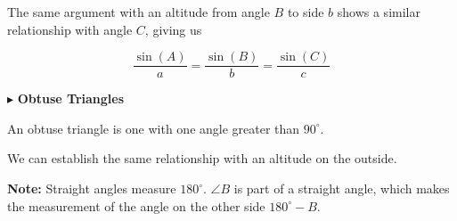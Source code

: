 \documentclass{ximera}
\begin{document}
The same argument with an altitude from angle $B$ to side $b$ shows a similar relationship with angle $C$, giving us








\[    \frac{\sin(A)}{a} = \frac{\sin(B)}{b}  = \frac{\sin(C)}{c}    \]
















$\blacktriangleright$  \textbf{\textcolor{blue!55!black}{Obtuse Triangles}}   

An obtuse triangle is one with one angle greater than $90^{\circ}$. 

We can establish the same relationship with an altitude on the outside.








\begin{image}[3in]
  \end{image}











\textbf{Note:}  Straight angles measure $180^{\circ}$.  $\angle B$ is part of a straight angle, which makes the measurement of the angle on the other side $180^{\circ} - B$. 
\end{document}
